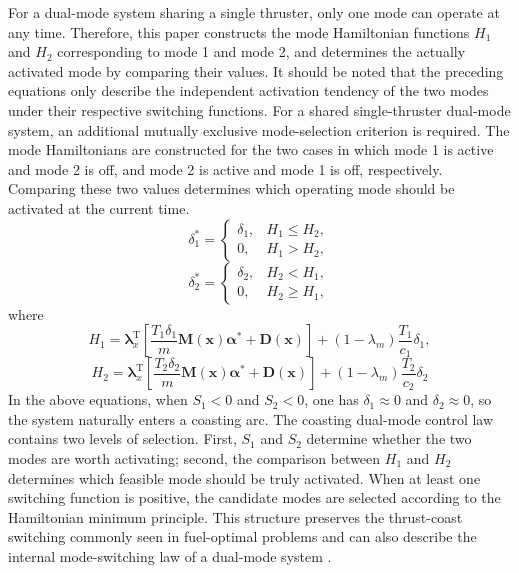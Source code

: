 ﻿\documentclass{IEEEtaes}
\begin{document}
For a dual-mode system sharing a single thruster, only one mode can operate at any time. Therefore, this paper constructs the mode Hamiltonian functions $H_1$ and $H_2$ corresponding to mode 1 and mode 2, and determines the actually activated mode by comparing their values. It should be noted that the preceding equations only describe the independent activation tendency of the two modes under their respective switching functions. For a shared single-thruster dual-mode system, an additional mutually exclusive mode-selection criterion is required. The mode Hamiltonians are constructed for the two cases in which mode 1 is active and mode 2 is off, and mode 2 is active and mode 1 is off, respectively. Comparing these two values determines which operating mode should be activated at the current time.
\begin{equation}
\delta_1^{*}=\begin{cases}
\delta_1, & H_1\leq H_2,\\
0, & H_1>H_2,
\end{cases}
\end{equation}
\begin{equation}
\delta_2^{*}=\begin{cases}
\delta_2, & H_2<H_1,\\
0, & H_2\geq H_1,
\end{cases}
\end{equation}
where
\begin{equation}
H_1=\bm{\lambda}_x^{\mathrm{T}}\left[\frac{T_1\delta_1}{m}\bm{M}(\bm{x})\bm{\alpha}^{*}+\bm{D}(\bm{x})\right]+(1-\lambda_m)\frac{T_1}{c_1}\delta_1,
\end{equation}
\begin{equation}
H_2=\bm{\lambda}_x^{\mathrm{T}}\left[\frac{T_2\delta_2}{m}\bm{M}(\bm{x})\bm{\alpha}^{*}+\bm{D}(\bm{x})\right]+(1-\lambda_m)\frac{T_2}{c_2}\delta_2
\end{equation}
In the above equations, when $S_1<0$ and $S_2<0$, one has $\delta_1\approx0$ and $\delta_2\approx0$, so the system naturally enters a coasting arc. The coasting dual-mode control law contains two levels of selection. First, $S_1$ and $S_2$ determine whether the two modes are worth activating; second, the comparison between $H_1$ and $H_2$ determines which feasible mode should be truly activated. When at least one switching function is positive, the candidate modes are selected according to the Hamiltonian minimum principle. This structure preserves the thrust-coast switching commonly seen in fuel-optimal problems and can also describe the internal mode-switching law of a dual-mode system \cite{cline2024a,huang2026}.
\end{document}
